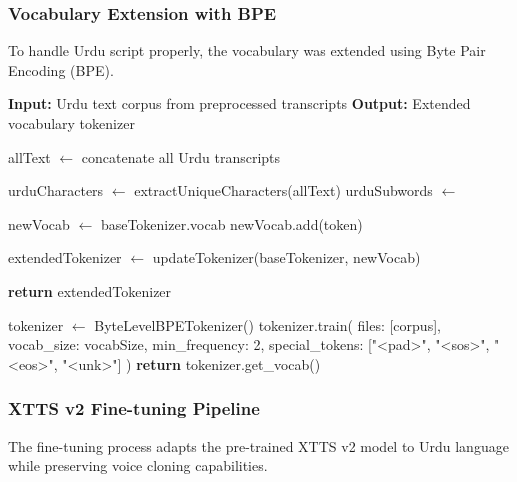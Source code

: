 \subsubsection{Vocabulary Extension with BPE}

To handle Urdu script properly, the vocabulary was extended using Byte Pair Encoding (BPE).

\begin{algorithm}[H]
\caption{Vocabulary Extension for Urdu Script}
\begin{algorithmic}[1]
\State \textbf{Input:} Urdu text corpus from preprocessed transcripts
\State \textbf{Output:} Extended vocabulary tokenizer

    \State allText $\gets$ concatenate all Urdu transcripts
    
    \State urduCharacters $\gets$ extractUniqueCharacters(allText)
    \State urduSubwords $\gets$ 
    
    \State newVocab $\gets$ baseTokenizer.vocab
            \State newVocab.add(token)
        \EndIf
    \EndFor
    
    \State extendedTokenizer $\gets$ updateTokenizer(baseTokenizer, newVocab)
    \State {}
    
    \State \textbf{return} extendedTokenizer
\EndProcedure

    \State tokenizer $\gets$ ByteLevelBPETokenizer()
    \State tokenizer.train(
        \State \quad files: [corpus],
        \State \quad vocab\_size: vocabSize,
        \State \quad min\_frequency: 2,
        \State \quad special\_tokens: ["<pad>", "<sos>", "<eos>", "<unk>"]
    \State )
    \State \textbf{return} tokenizer.get\_vocab()
\EndProcedure
\end{algorithmic}
\end{algorithm}

\subsubsection{XTTS v2 Fine-tuning Pipeline}

The fine-tuning process adapts the pre-trained XTTS v2 model to Urdu language while preserving voice cloning capabilities.

